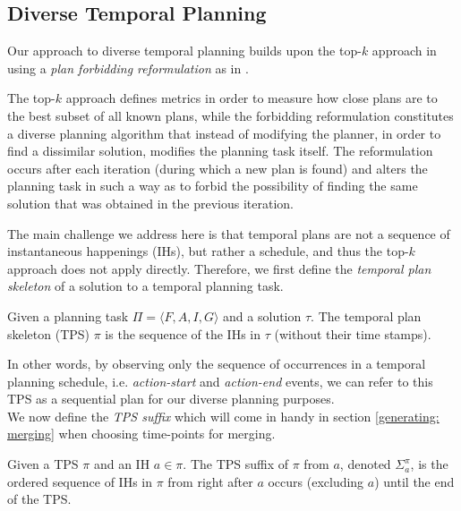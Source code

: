 \subsection{Diverse Temporal Planning}
\label{background: Diverse Temporal}

Our approach to diverse temporal planning builds upon the top-$k$ approach in \cite{katz2019reshaping} using a {\em plan forbidding reformulation} as in \cite{katz2018novel} . 

The top-$k$ approach defines metrics in order to measure how close plans are to the best subset of all known plans, while the forbidding reformulation constitutes a diverse planning algorithm that instead of modifying the planner, in order to find a dissimilar solution, modifies the planning task itself. The reformulation occurs after each iteration (during which a new plan is found) and alters the planning task in such a way as to forbid the possibility of finding the same solution that was obtained in the previous iteration.

The main challenge we address here is that temporal plans are not a sequence of instantaneous happenings (IHs), but rather a schedule, and thus the top-$k$ approach does not apply directly. Therefore, we first define the {\em temporal plan skeleton} of a solution to a temporal planning task.

\begin{definition}
Given a planning task $\Pi = \langle F,A,I,G \rangle$ and a solution $\tau$. 
The temporal plan skeleton (TPS) $\pi$ is the sequence of the IHs in $\tau$ (without their time stamps).
\end{definition}

In other words, by observing only the sequence of occurrences in a temporal planning schedule, i.e. \textit{action-start} and \textit{action-end} events, we can refer to this TPS as a sequential plan for our diverse planning purposes. \\
We now define the \textit{TPS suffix} which will come in handy in section \ref{generating: merging} when choosing time-points for merging.

\begin{definition}
Given a TPS $\pi$ and an IH $a \in \pi$. The TPS suffix of $\pi$ from $a$, denoted $\Sigma^\pi_a$, is the ordered sequence of IHs in $\pi$ from right after $a$ occurs (excluding $a$) until the end of the TPS.
\end{definition}


